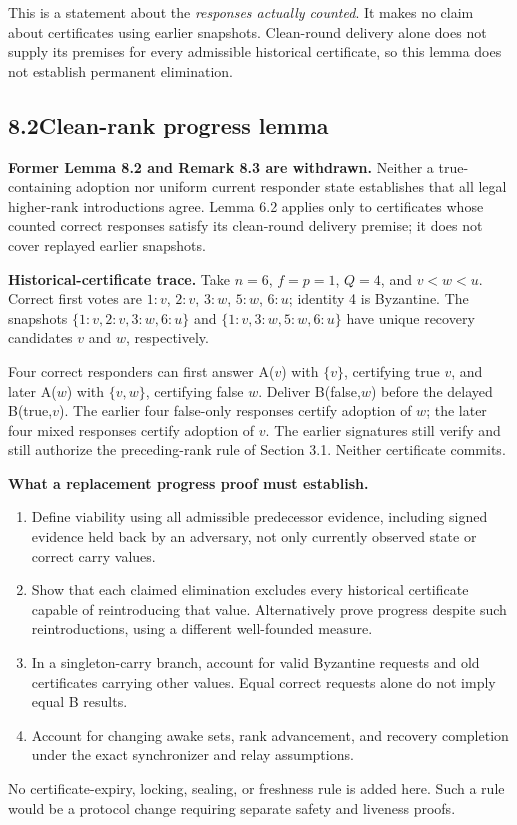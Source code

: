 \documentclass[11pt,a4paper]{article}
\newcommand{\page}[1]{\clearpage\setcounter{page}{#1}}
\begin{document}
This is a statement about the \emph{responses actually counted}. It makes no claim about certificates using earlier snapshots. Clean-round delivery alone does not supply its premises for every admissible historical certificate, so this lemma does not establish permanent elimination.
\page{12}
\subsection*{8.2\quad Clean-rank progress lemma}
\textbf{Former Lemma 8.2 and Remark 8.3 are withdrawn.} Neither a true-containing adoption nor uniform current responder state establishes that all legal higher-rank introductions agree. Lemma 6.2 applies only to certificates whose counted correct responses satisfy its clean-round delivery premise; it does not cover replayed earlier snapshots.

\textbf{Historical-certificate trace.} Take $n=6$, $f=p=1$, $Q=4$, and $v<w<u$. Correct first votes are $1:v$, $2:v$, $3:w$, $5:w$, $6:u$; identity 4 is Byzantine. The snapshots $\{1:v,2:v,3:w,6:u\}$ and $\{1:v,3:w,5:w,6:u\}$ have unique recovery candidates $v$ and $w$, respectively.

Four correct responders can first answer A($v$) with $\{v\}$, certifying true $v$, and later A($w$) with $\{v,w\}$, certifying false $w$. Deliver B(false,$w$) before the delayed B(true,$v$). The earlier four false-only responses certify adoption of $w$; the later four mixed responses certify adoption of $v$. The earlier signatures still verify and still authorize the preceding-rank rule of Section 3.1. Neither certificate commits.

\textbf{What a replacement progress proof must establish.}
\begin{enumerate}
\item Define viability using all admissible predecessor evidence, including signed evidence held back by an adversary, not only currently observed state or correct carry values.
\item Show that each claimed elimination excludes every historical certificate capable of reintroducing that value. Alternatively prove progress despite such reintroductions, using a different well-founded measure.
\item In a singleton-carry branch, account for valid Byzantine requests and old certificates carrying other values. Equal correct requests alone do not imply equal B results.
\item Account for changing awake sets, rank advancement, and recovery completion under the exact synchronizer and relay assumptions.
\end{enumerate}
No certificate-expiry, locking, sealing, or freshness rule is added here. Such a rule would be a protocol change requiring separate safety and liveness proofs.
\end{document}

